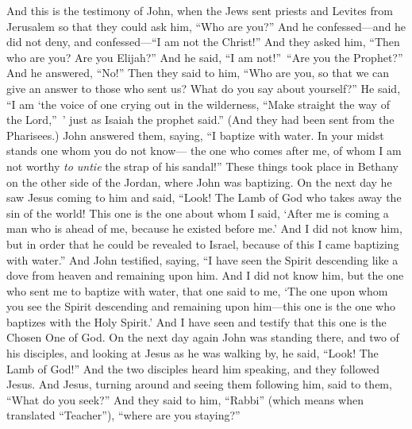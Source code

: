 \begin{biblechapter}
 And this is the testimony of John, when the Jews sent priests and Levites from Jerusalem so that they could ask him, “Who are you?”
\verse And he confessed—and he did not deny, and confessed—“I am not the Christ!”
\verse And they asked him, “Then who are you? Are you Elijah?” And he said, “I am not!” “Are you the Prophet?” And he answered, “No!”
\verse Then they said to him, “Who are you, so that we can give an answer to those who sent us? What do you say about yourself?”
\verse He said, “I am ‘the voice of one crying out in the wilderness, 
“Make straight the way of the Lord,” ’
\verse just as Isaiah the prophet said.”
\verse (And they had been sent from the Pharisees.)
\verse John answered them, saying, “I baptize with water. In your midst stands one whom you do not know—
\verse the one who comes after me, of whom I am not worthy \textit{to untie} the strap of his sandal!”
\verse These things took place in Bethany on the other side of the Jordan, where John was baptizing.
\verse On the next day he saw Jesus coming to him and said, “Look! The Lamb of God who takes away the sin of the world!
\verse This one is the one about whom I said, ‘After me is coming a man who is ahead of me, because he existed before me.’
\verse And I did not know him, but in order that he could be revealed to Israel, because of this I came baptizing with water.”
\verse And John testified, saying, “I have seen the Spirit descending like a dove from heaven and remaining upon him.
\verse And I did not know him, but the one who sent me to baptize with water, that one said to me, ‘The one upon whom you see the Spirit descending and remaining upon him—this one is the one who baptizes with the Holy Spirit.’
\verse And I have seen and testify that this one is the Chosen One of God.
 On the next day again John was standing there, and two of his disciples,
\verse and looking at Jesus as he was walking by, he said, “Look! The Lamb of God!”
\verse And the two disciples heard him speaking, and they followed Jesus.
\verse And Jesus, turning around and seeing them following him, said to them, “What do you seek?” And they said to him, “Rabbi” (which means when translated “Teacher”), “where are you staying?”

\end{biblechapter}
